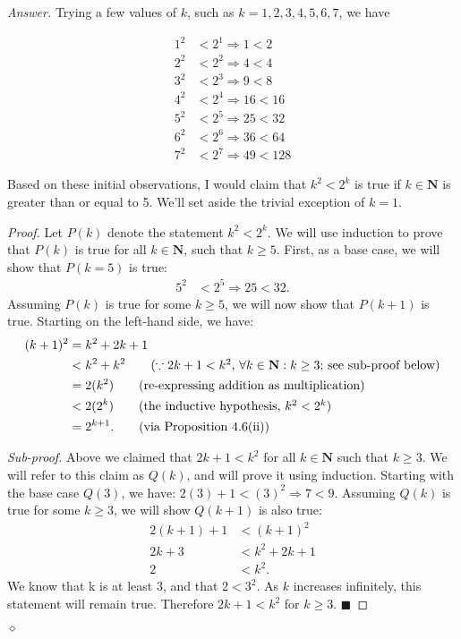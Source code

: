\documentclass[12pt,oneside]{amsart}
\theoremstyle{remark}
\newcommand{\bfN}{\mathbf{N}}
\newenvironment{answer}{\bigskip\noindent\emph{Answer.}}{\hfill$\diamond$\newline}
\begin{document}
\begin{answer}
Trying a few values of $k$, such as $k = 1, 2, 3, 4, 5, 6, 7$, we have

\begin{align*}
1^2 &< 2^1 \Rightarrow 1 < 2 \tag{k = 1, true} \\
2^2 &< 2^2 \Rightarrow 4 < 4 \tag{k = 2, false} \\
3^2 &< 2^3 \Rightarrow 9 < 8 \tag{k = 3, false} \\
4^2 &< 2^4 \Rightarrow 16 < 16 \tag{k = 4, false} \\
5^2 &< 2^5 \Rightarrow 25 < 32 \tag{k = 5, true} \\
6^2 &< 2^6 \Rightarrow 36 < 64 \tag{k = 6, true} \\
7^2 &< 2^7 \Rightarrow 49 < 128 \tag{k = 7, true}
\end{align*}

Based on these initial observations, I would claim that $k^2 < 2^k$ is true if $k \in \bfN$ is greater than or equal to 5. We'll set aside the trivial exception of $k = 1$.

\begin{proof}
Let $P(k)$ denote the statement $k^2 < 2^k$. We will use induction to prove that $P(k)$ is true for all $k \in \bfN$, such that $k \geq 5$. First, as a base case, we will show that $P(k = 5)$ is true:
\begin{align*}
5^2 &< 2^5 \Rightarrow 25 < 32.
\end{align*}
Assuming $P(k)$ is true for some $k \geq 5$, we will now show that $P(k + 1)$ is true. Starting on the left-hand side, we have:
\begin{align*}
(k + 1)^2 &= k^2 + 2k + 1 \\
          &< k^2 + k^2 \tag{$\because 2k + 1 < k^2$, $\forall k \in \bfN : k \geq 3$; see sub-proof below} \\
          &= 2(k^2) \tag{re-expressing addition as multiplication} \\
          &< 2(2^k) \tag{the inductive hypothesis, $k^2 < 2^k$} \\
          &= 2^{k + 1}. \tag{via Proposition 4.6(ii)}
\end{align*}

\emph{Sub-proof.} Above we claimed that $2k + 1 < k^2$ for all $k \in \bfN$ such that $k \geq 3$. We will refer to this claim as $Q(k)$, and will prove it using induction. Starting with the base case $Q(3)$, we have: $2(3) + 1 < (3)^2 \Rightarrow 7 < 9$. Assuming $Q(k)$ is true for some $k \geq 3$, we will show $Q(k + 1)$ is also true:
\begin{align*}
2(k + 1) + 1 &< (k + 1)^2 \\
      2k + 3 &< k^2 + 2k + 1 \tag{distributing on both sides} \\
           2 &< k^2. \tag{subtracting out common terms}
\end{align*}
We know that k is at least 3, and that $2 < 3^2$. As $k$ increases infinitely, this statement will remain true. Therefore $2k + 1 < k^2$ for $k \geq 3$. $\blacksquare$


\end{proof}
\end{answer}
\end{document}
